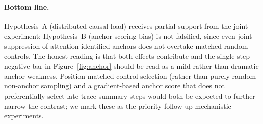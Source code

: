 \documentclass{article}
\theoremstyle{plain}
\theoremstyle{definition}
\theoremstyle{remark}
\begin{document}
\paragraph{Bottom line.} Hypothesis~A (distributed causal load)
receives partial support from the joint experiment; Hypothesis~B
(anchor scoring bias) is not falsified, since even joint suppression
of attention-identified anchors does not overtake matched random
controls. The honest reading is that both effects contribute and the
single-step negative bar in Figure~\ref{fig:anchor} should be read as
a mild rather than dramatic anchor weakness. Position-matched control
selection (rather than purely random non-anchor sampling) and a
gradient-based anchor score that does not preferentially select
late-trace summary steps would both be expected to further narrow
the contrast; we mark these as the priority follow-up mechanistic
experiments.
\end{document}
